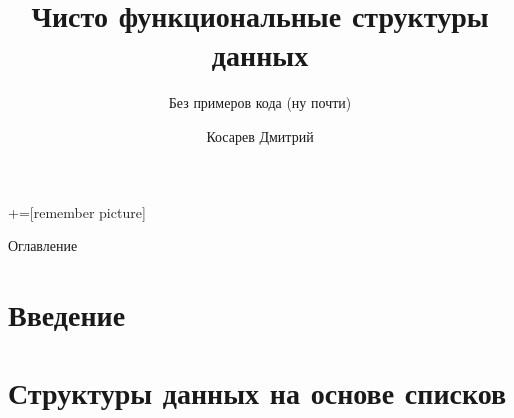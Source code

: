 \documentclass[aspectratio=169
  , xcolor={svgnames}
  , hyperref=
      { colorlinks
      , urlcolor=DarkBlue
      }
  , russian  %
  ]{beamer}
\title[PFDS без примеров кода (ну почти)]{Чисто функциональные структуры данных}
\subtitle{Без примеров кода (ну почти)}
\author{Косарев Дмитрий}
\institute{матмех СПбГУ}
\theoremstyle{exerciseStyle1}
\begin{document}
\maketitle

+=[remember picture]

\everymath{\displaystyle}

\begin{frame}{Оглавление}
\end{frame}

%


\section{Введение}


\section{Структуры данных на основе списков}

\end{document}
